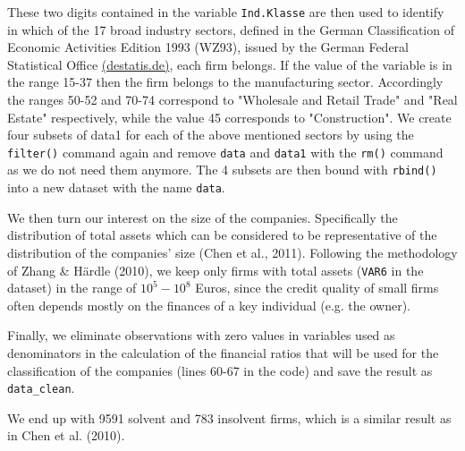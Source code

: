 \documentclass{article}
\begin{document}
These two digits contained in the variable \texttt{Ind.Klasse} are then used to identify in which of the 17 broad industry sectors, defined in the German Classification of Economic Activities Edition 1993 (WZ93), issued by the German Federal Statistical Office \href{https://www.destatis.de/DE/Methoden/Klassifikationen/GueterWirtschaftklassifikationen/Content75/KlassifikationWZ93.html}{(destatis.de)}, each firm belongs. If the value of the variable is in the range 15-37 then the firm belongs to the manufacturing sector. Accordingly the ranges 50-52 and 70-74 correspond to "Wholesale and Retail Trade" and "Real Estate" respectively, while the value 45 corresponds to "Construction". We create four subsets of data1 for each of the above mentioned sectors by using the \texttt{filter()} command again and remove \texttt{data} and \texttt{data1} with the \texttt{rm()} command as we do not need them anymore. The 4 subsets are then bound with \texttt{rbind()} into a new dataset with the name \texttt{data}. 



We then turn our interest on the size of the companies. Specifically the distribution of total assets which can be considered to be representative of the distribution of the companies' size (Chen et al., 2011). Following the methodology of Zhang \& H{\"a}rdle (2010), we keep only firms with total assets (\texttt{VAR6} in the dataset) in the range of $10^5 - 10^8$ Euros, since the credit quality of small firms often depends mostly on the finances of a key individual (e.g. the owner).

Finally, we eliminate observations with zero values in variables used as denominators in the calculation of the financial ratios that will be used for the classification of the companies (lines 60-67 in the code) and save the result as \texttt{data\_clean}. 



We end up with 9591 solvent and 783 insolvent firms, which is a similar result as in Chen et al. (2010). 
\end{document}

